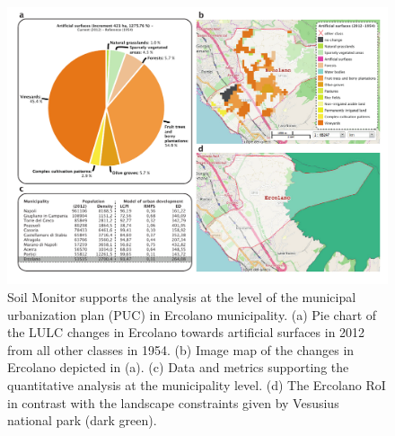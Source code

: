 \documentclass[APA,LATO1COL,doublespace]{WileyNJD-v2}
\begin{document}
\begin{figure}[t] %
    \centerline{\includegraphics[width=450pt]{07_caso_comunale.pdf}}
    \caption{ Soil Monitor supports the analysis at the level of the municipal urbanization plan (PUC) in Ercolano municipality.
              (a) Pie chart of the LULC changes in Ercolano towards artificial surfaces in 2012 from all other classes in 1954.
              (b) Image map of the changes in Ercolano depicted in (a).
              (c) Data and metrics supporting the quantitative analysis at the municipality level.
              (d) The Ercolano RoI in contrast with the landscape constraints given by Vesusius national park (dark green). }
    \label{fig:caseCOM_Ercolano}
\end{figure}
\end{document}
